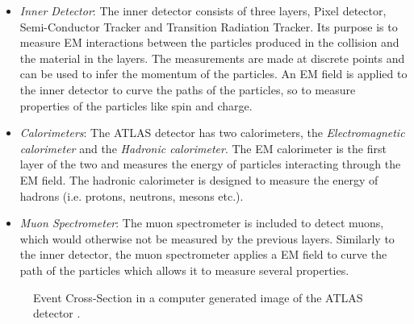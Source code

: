 \begin{itemize}
    \item \emph{Inner Detector}: The inner detector consists of three layers, Pixel detector, Semi-Conductor Tracker 
          and Transition Radiation Tracker. Its purpose is to measure \ac{EM} interactions between the particles 
          produced in the collision and the material in the layers. The measurements are made at discrete points and can be 
          used to infer the momentum of the particles. An \ac{EM} field is applied to the inner detector
          to curve the paths of the particles, so to measure properties of the particles like spin and charge.  
    \item \emph{Calorimeters}: The \ac{ATLAS} detector has two calorimeters, the \emph{Electromagnetic calorimeter} and the 
           \emph{Hadronic calorimeter}. The \ac{EM} calorimeter is the first layer of the two and measures the energy of 
           particles interacting through the \ac{EM} field. The hadronic calorimeter is designed to measure the energy of 
           hadrons (i.e. protons, neutrons, mesons etc.).
    \item \emph{Muon Spectrometer}: The muon spectrometer is included to detect muons, which would otherwise not be measured 
           by the previous layers. Similarly to the inner detector, the muon spectrometer applies a \ac{EM} field to 
           curve the path of the particles which allows it to measure several properties. 
\end{itemize}
\begin{figure}
    \centering
    \caption[Event Cross Section in a computer generated image of the
    \acs{ATLAS} detector.]{Event Cross-Section in a computer generated image of the
    ATLAS detector \cite{PDetector}.}
    \label{fig:detector}
\end{figure}

